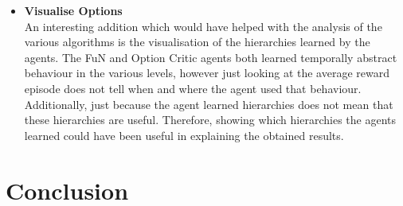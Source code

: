 \documentclass[notitlepage,a4paper,11pt]{article}
\begin{document}
\begin{itemize}
	\item
	\textbf{Visualise Options}\\
	An interesting addition which would have helped with the analysis of the various algorithms is the visualisation of the hierarchies learned by the agents. The FuN and Option Critic agents both learned temporally abstract behaviour in the various levels, however just looking at the average reward episode does not tell when and where the agent used that behaviour. Additionally, just because the agent learned hierarchies does not mean that these hierarchies are useful. Therefore, showing which hierarchies the agents learned could have been useful in explaining the obtained results.
	
	
\end{itemize}


\section{Conclusion}

\pagebreak



\end{document}
